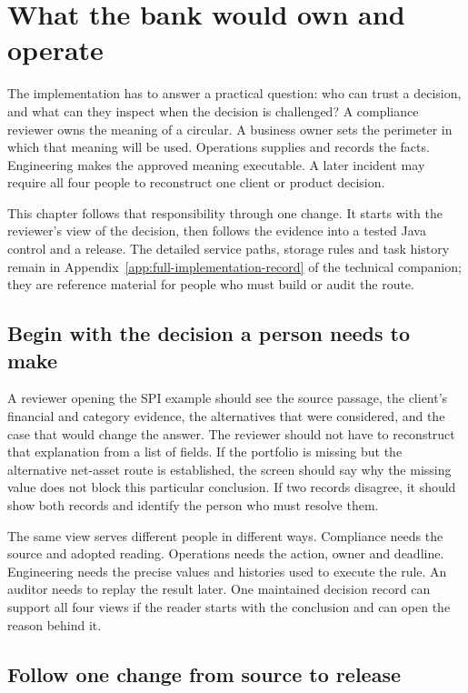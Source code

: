 \chapter{What the bank would own and operate}
\label{ch:implementation}

The implementation has to answer a practical question: who can trust a decision,
and what can they inspect when the decision is challenged? A compliance
reviewer owns the meaning of a circular. A business owner sets the perimeter in
which that meaning will be used. Operations supplies and records the facts.
Engineering makes the approved meaning executable. A later incident may require
all four people to reconstruct one client or product decision.

This chapter follows that responsibility through one change. It starts with the
reviewer's view of the decision, then follows the evidence into a tested Java
control and a release. The detailed service paths, storage rules and task history
remain in Appendix~\ref{app:full-implementation-record} of the technical companion; they are reference
material for people who must build or audit the route.

\section{Begin with the decision a person needs to make}

A reviewer opening the SPI example should see the source passage, the client's
financial and category evidence, the alternatives that were considered, and the
case that would change the answer. The reviewer should not have to reconstruct
that explanation from a list of fields. If the portfolio is missing but the
alternative net-asset route is established, the screen should say why the missing
value does not block this particular conclusion. If two records disagree, it
should show both records and identify the person who must resolve them.

The same view serves different people in different ways. Compliance needs the
source and adopted reading. Operations needs the action, owner and deadline.
Engineering needs the precise values and histories used to execute the rule. An
auditor needs to replay the result later. One maintained decision record can
support all four views if the reader starts with the conclusion and can open the
reason behind it.

\section{Follow one change from source to release}


